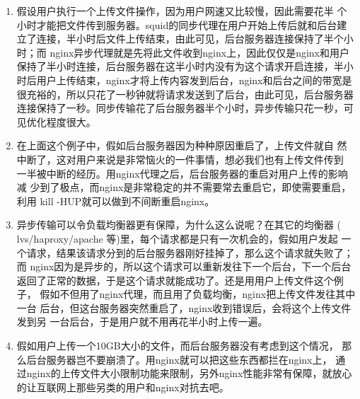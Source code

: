 \begin{enumerate}[itemsep=0pt,parsep=0pt]
\item 假设用户执行一个上传文件操作，因为用户网速又比较慢，因此需要花半
  个小时才能把文件传到服务器。squid的同步代理在用户开始上传后就和后台建
  立了连接，半小时后文件上传结束，由此可见，后台服务器连接保持了半个小
  时；而 nginx异步代理就是先将此文件收到nginx上，因此仅仅是nginx和用户
  保持了半小时连接，后台服务器在这半小时内没有为这个请求开启连接，半小
  时后用户上传结束，nginx才将上传内容发到后台，nginx和后台之间的带宽是
  很充裕的，所以只花了一秒钟就将请求发送到了后台，由此可见，后台服务器
  连接保持了一秒。同步传输花了后台服务器半个小时，异步传输只花一秒，可
  见优化程度很大。

\item 在上面这个例子中，假如后台服务器因为种种原因重启了，上传文件就自
  然中断了，这对用户来说是非常恼火的一件事情，想必我们也有上传文件传到
  一半被中断的经历。用nginx代理之后，后台服务器的重启对用户上传的影响减
  少到了极点，而nginx是非常稳定的并不需要常去重启它，即使需要重启，利用
  kill -HUP就可以做到不间断重启nginx。

\item 异步传输可以令负载均衡器更有保障，为什么这么说呢？在其它的均衡器
  ( lvs/haproxy/apache 等)里，每个请求都是只有一次机会的，假如用户发起
  一个请求，结果该请求分到的后台服务器刚好挂掉了，那么这个请求就失败了；
  而 nginx因为是异步的，所以这个请求可以重新发往下一个后台，下一个后台
  返回了正常的数据，于是这个请求就能成功了。还是用用户上传文件这个例子，
  假如不但用了nginx代理，而且用了负载均衡，nginx把上传文件发往其中一台
  后台，但这台服务器突然重启了，nginx收到错误后，会将这个上传文件发到另
  一台后台，于是用户就不用再花半小时上传一遍。

\item 假如用户上传一个10GB大小的文件，而后台服务器没有考虑到这个情况，
  那么后台服务器岂不要崩溃了。用nginx就可以把这些东西都拦在nginx上， 通
  过nginx的上传文件大小限制功能来限制，另外nginx性能非常有保障，就放心
  的让互联网上那些另类的用户和nginx对抗去吧。
\end{enumerate}

